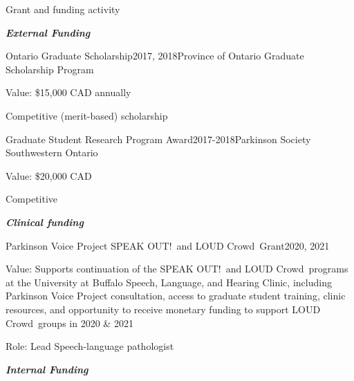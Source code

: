 \documentclass{resume} %
\begin{document}
\begin{rSection}{Grant and funding activity}

\begin{center}
	{\bf \emph{External Funding}}
\end{center}

\begin{rSubsection}{Ontario Graduate Scholarship}{2017, 2018}{Province of Ontario Graduate Scholarship Program}{}
	\item Value: \$15,000 CAD annually
	\item Competitive (merit-based) scholarship
\end{rSubsection}

\begin{rSubsection}{Graduate Student Research Program Award}{2017-2018}{Parkinson Society Southwestern Ontario}{}
	\item Value: \$20,000 CAD
	\item Competitive
\end{rSubsection}
%


\begin{center}
	{\bf \emph{Clinical funding}}
\end{center}

\begin{rSubsection}{Parkinson Voice Project SPEAK OUT!\textregistered \ and LOUD Crowd\textregistered \ Grant}{2020, 2021}{}{} %
	\item Value: Supports continuation of the SPEAK OUT!\textregistered \ and LOUD Crowd\textregistered \ programs at the University at Buffalo Speech, Language, and Hearing Clinic, including Parkinson Voice Project consultation, access to graduate student training, clinic resources, and opportunity to receive monetary funding to support LOUD Crowd\textregistered \ groups in 2020 \& 2021
	\item Role: Lead Speech-language pathologist
\end{rSubsection}



\begin{center}
	{\bf \emph{Internal Funding}}
\end{center}


\end{rSection}
\end{document}

